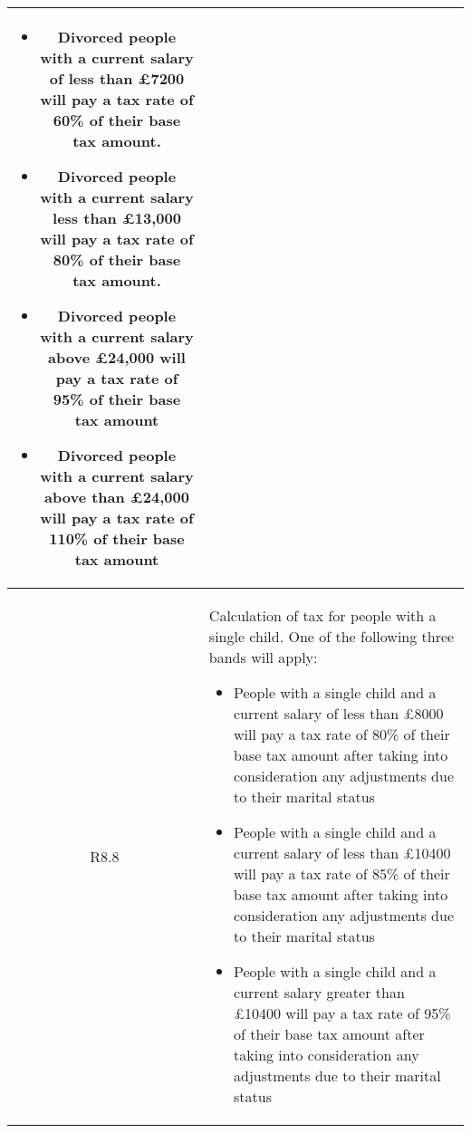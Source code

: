 \begin{table}[H]
\begin{tabularx}{\textwidth}{| c | X |}
	\begin{itemize}[itemsep=\tableitemsep, leftmargin=\tableleftsep]
		\item Divorced people with a current salary of less than £7200 will pay a tax rate
		of 60\% of their base tax amount.
		\item Divorced people with a current salary less than £13,000 will pay a tax rate of
		80\% of their base tax amount.
		\item Divorced people with a current salary above £24,000 will pay a tax rate of
		95\% of their base tax amount
		\item Divorced people with a current salary above than £24,000 will pay a tax rate
		of 110\% of their base tax amount
	\end{itemize}
	\\
	\hline %
	R8.8 & Calculation of tax for people with a single child. One of the following three bands will apply:
	\begin{itemize}[itemsep=\tableitemsep, leftmargin=\tableleftsep]
		\item People with a single child and a current salary of less than £8000 will pay a tax rate of 80\% of their base tax amount after taking into consideration any
		adjustments due to their marital status
		\item People with a single child and a current salary of less than £10400 will pay a
		tax rate of 85\% of their base tax amount after taking into consideration any
		adjustments due to their marital status
		\item People with a single child and a current salary greater than £10400 will pay a
		tax rate of 95\% of their base tax amount after taking into consideration any adjustments due to their marital status
	\end{itemize}
	\\
	\hline %
\end{tabularx}
\end{table}

